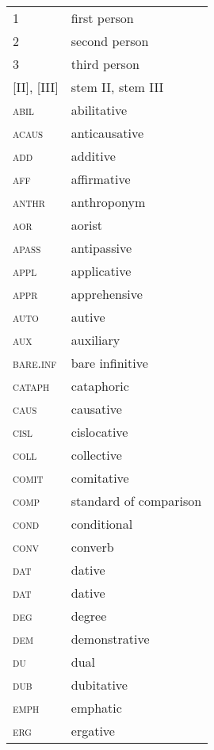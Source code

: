
\begin{multicols}{2} 


\begin{tabular}{lp{4.5cm}} 
1	&	first person	\\
2	&	second person	\\
3	&	third person	\\
{[II]}, {[III]}	&	stem II, stem III	\\
\textsc{abil} 	&	abilitative	\\
\textsc{acaus} 	&	anticausative	\\
\textsc{add} 	&	additive	\\
\textsc{aff} 	&	affirmative	\\
\textsc{anthr} 	&	anthroponym	\\
\textsc{aor} 	&	aorist	\\
\textsc{apass} 	&	antipassive	\\
\textsc{appl} 	&	applicative	\\
\textsc{appr} 	&	apprehensive	\\
\textsc{auto} 	&	autive	\\
\textsc{aux} 	&	auxiliary	\\
\textsc{bare.inf} 	&	bare infinitive	\\
\textsc{cataph} 	&	cataphoric	\\
\textsc{caus} 	&	causative	\\
\textsc{cisl} 	&	cislocative	\\
\textsc{coll} 	&	collective	\\
\textsc{comit} 	&	comitative	\\
\textsc{comp} 	&	standard of comparison	\\
\textsc{cond} 	&	conditional	\\
\textsc{conv} 	&	converb	\\
\textsc{dat} 	&	dative	\\
\textsc{dat} 	&	dative	\\
\textsc{deg} 	&	degree	\\
\textsc{dem } 	&	demonstrative	\\
\textsc{du} 	&	dual	\\
\textsc{dub} 	&	dubitative	\\
	\textsc{emph} 	&	emphatic	\\
 	\textsc{erg} 	&	ergative	\\
\end{tabular}
%
\begin{tabular}{lp{4.5cm}}  

\end{tabular}
\end{multicols}
